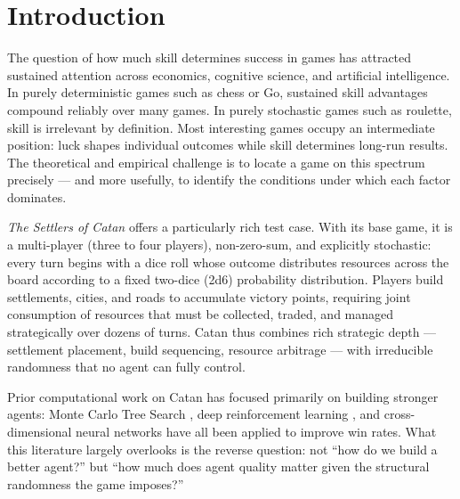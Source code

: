 \documentclass[12pt,a4paper]{article}
\begin{document}
\begin{abstract}
\medskip\noindent
\textbf{Keywords:} Catan; stochastic games; luck vs.\ skill; Monte Carlo
Tree Search; player order bias; dice deviation; heuristic agents;
structural stochasticity; brute-force placement.
\end{abstract}

\newpage
\tableofcontents
\newpage

\section{Introduction}

The question of how much skill determines success in games has attracted
sustained attention across economics, cognitive science, and artificial
intelligence. In purely deterministic games such as chess or Go,
sustained skill advantages compound reliably over many games. In purely
stochastic games such as roulette, skill is irrelevant by definition.
Most interesting games occupy an intermediate position: luck shapes
individual outcomes while skill determines long-run results. The
theoretical and empirical challenge is to locate a game on this spectrum
precisely --- and more usefully, to identify the conditions under which
each factor dominates.

\textit{The Settlers of Catan} \cite{teuber1995catan} offers a
particularly rich test case. With its base game, it is a multi-player (three to four players),
non-zero-sum, and explicitly stochastic: every turn begins with a dice
roll whose outcome distributes resources across the board according to a
fixed two-dice (2d6) probability distribution. Players build settlements,
cities, and roads to accumulate victory points, requiring joint
consumption of resources that must be collected, traded, and managed
strategically over dozens of turns. Catan thus combines rich strategic
depth --- settlement placement, build sequencing, resource arbitrage ---
with irreducible randomness that no agent can fully control.

Prior computational work on Catan has focused primarily on building
stronger agents: Monte Carlo Tree Search \cite{szita2010mcts}, deep
reinforcement learning \cite{xenou2018deep}, and cross-dimensional neural
networks \cite{gendre2020catan} have all been applied to improve win
rates. What this literature largely overlooks is the reverse question:
not ``how do we build a better agent?'' but ``how much does agent quality
matter given the structural randomness the game imposes?''
\end{document}
